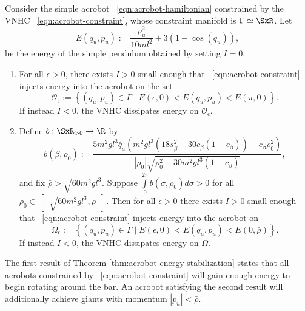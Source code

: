 \begin{thm}\label{thm:acrobot-energy-stabilization}
    Consider the simple acrobot ~\eqref{eqn:acrobot-hamiltonian} constrained by
    the VNHC ~\eqref{eqn:acrobot-constraint}, whose
    constraint manifold is \(\Gamma \simeq \SxR\).
    Let 
    \[
        E(q_u,p_u) := \frac{p_u^2}{10ml^2} + 3(1 - \cos(q_u))
        ,
    \]
    be the energy of the simple pendulum obtained by setting \(I = 0\).
\begin{enumerate}
    \item For all \(\epsilon > 0\), there exists \(I > 0\) small enough that 
    ~\eqref{eqn:acrobot-constraint} injects energy into the acrobot on the set
    \[
        \mathcal{O}_\epsilon := \left\{(q_u,p_u) \in \Gamma 
        \mid E(\epsilon,0) < E(q_u,p_u) < E(\pi,0) \right\}
        .
    \]
    If instead \(I < 0\), the VNHC dissipates energy on \(\mathcal{O}_\epsilon\).
\item Define \(b : \SxR_{> 0} \rightarrow \R\) by
    \[
        b(\beta,\rho_0) := 
        \frac{5m^2 g l^3 \bar{q}_a \left(
            m^2gl^3\left(18s_\beta^2 + 30c_\beta(1 - c_\beta)\right)
            - c_\beta\rho_0^2
        \right)}{
        |\rho_0|\sqrt{\rho_0^2 - 30m^2gl^3(1 - c_\beta)}
        }
        ,
    \]
    and fix \(\bar{\rho} > \sqrt{60m^2gl^3}\).
    Suppose \(\int \limits_{0}^{2\pi} b(\sigma,\rho_0)d\sigma > 0\) for all 
    \(\rho_0 \in \, \left]\sqrt{60m^2gl^3}, \bar{\rho}\right[\).
    Then for all \(\epsilon > 0\) there exists \(I > 0\) small enough that
    ~\eqref{eqn:acrobot-constraint} injects energy into the acrobot on
    \[
        \Omega_\epsilon := \left\{(q_u,p_u) \in \Gamma 
        \mid E(\epsilon,0) < E(q_u,p_u) < E(0,\bar{\rho})\right\}
        .
    \]
    If instead \(I < 0\), the VNHC dissipates energy on \(\Omega\).
\end{enumerate}
\end{thm}
The first result of Theorem \ref{thm:acrobot-energy-stabilization} states
that all acrobots constrained by ~\eqref{eqn:acrobot-constraint} 
will gain enough energy to begin rotating around the bar.
An acrobot satisfying the second result will additionally achieve giants with momentum
\(|p_u| < \bar{\rho}\).

